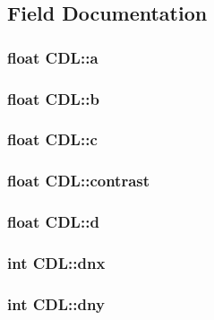 \subsection{Field Documentation}
\subsubsection{\setlength{\rightskip}{0pt plus 5cm}float \bf{CDL::a}}\label{structCDL_b1d11bd2202595646116908dd8f92d05}


\subsubsection{\setlength{\rightskip}{0pt plus 5cm}float \bf{CDL::b}}\label{structCDL_7cbaad623d4409e3a0743e507213829b}


\subsubsection{\setlength{\rightskip}{0pt plus 5cm}float \bf{CDL::c}}\label{structCDL_928d95559c101a1b1c9612202fdc4c74}


\subsubsection{\setlength{\rightskip}{0pt plus 5cm}float \bf{CDL::contrast}}\label{structCDL_3f08cab19feb0496d69fb3ab9149595e}


\subsubsection{\setlength{\rightskip}{0pt plus 5cm}float \bf{CDL::d}}\label{structCDL_bd75ee992fbb7c148884389609d49cea}


\subsubsection{\setlength{\rightskip}{0pt plus 5cm}int \bf{CDL::dnx}}\label{structCDL_9de14151c15d4977b07a51b353ebcd31}


\subsubsection{\setlength{\rightskip}{0pt plus 5cm}int \bf{CDL::dny}}\label{structCDL_3998cd9a42dc672eb25618fee1cb8625}


